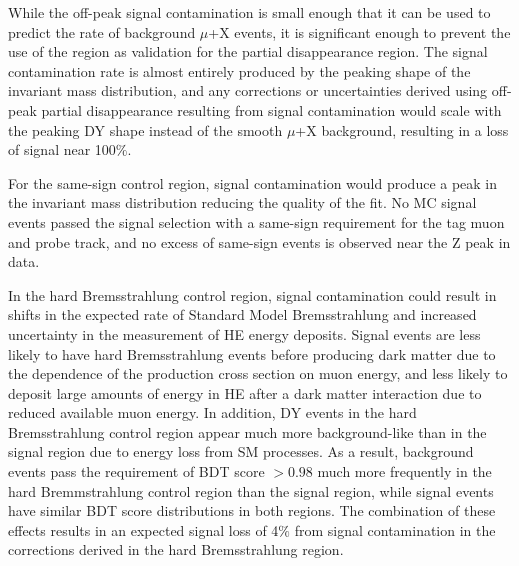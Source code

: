 While the off-peak signal contamination is small enough that it can be used to predict the rate of background $\mu$+X events, it is significant enough to prevent the use of the region as validation for the partial disappearance region. The signal contamination rate is almost entirely produced by the peaking shape of the invariant mass distribution, and any corrections or uncertainties derived using off-peak partial disappearance resulting from signal contamination would scale with the peaking DY shape instead of the smooth $\mu$+X background, resulting in a loss of signal near 100$\%$.

For the same-sign control region, signal contamination would produce a peak in the invariant mass distribution reducing the quality of the fit. No MC signal events passed the signal selection with a same-sign requirement for the tag muon and probe track, and no excess of same-sign events is observed near the Z peak in data.

In the hard Bremsstrahlung control region, signal contamination could result in shifts in the expected rate of Standard Model Bremsstrahlung and increased uncertainty in the measurement of HE energy deposits. Signal events are less likely to have hard Bremsstrahlung events before producing dark matter due to the dependence of the production cross section on muon energy, and less likely to deposit large amounts of energy in HE after a dark matter interaction due to reduced available muon energy. In addition, DY events in the hard Bremsstrahlung control region appear much more background-like than in the signal region due to energy loss from SM processes. As a result, background events pass the requirement of BDT score $>0.98$ much more frequently in the hard Bremmstrahlung control region than the signal region, while signal events have similar BDT score distributions in both regions. The combination of these effects results in an expected signal loss of 4$\%$ from signal contamination in the corrections derived in the hard Bremsstrahlung region.
